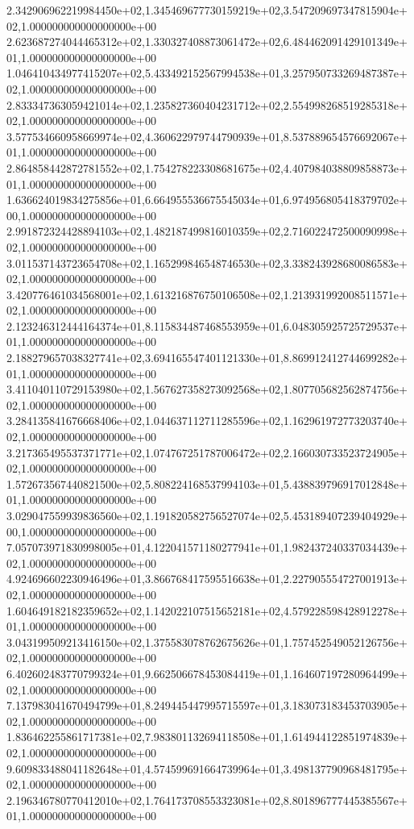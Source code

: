 2.342906962219984450e+02,1.345469677730159219e+02,3.547209697347815904e+02,1.000000000000000000e+00
2.623687274044465312e+02,1.330327408873061472e+02,6.484462091429101349e+01,1.000000000000000000e+00
1.046410434977415207e+02,5.433492152567994538e+01,3.257950733269487387e+02,1.000000000000000000e+00
2.833347363059421014e+02,1.235827360404231712e+02,2.554998268519285318e+02,1.000000000000000000e+00
3.577534660958669974e+02,4.360622979744790939e+01,8.537889654576692067e+01,1.000000000000000000e+00
2.864858442872781552e+02,1.754278223308681675e+02,4.407984038809858873e+01,1.000000000000000000e+00
1.636624019834275856e+01,6.664955536675545034e+01,6.974956805418379702e+00,1.000000000000000000e+00
2.991872324428894103e+02,1.482187499816010359e+02,2.716022472500090998e+02,1.000000000000000000e+00
3.011537143723654708e+02,1.165299846548746530e+02,3.338243928680086583e+02,1.000000000000000000e+00
3.420776461034568001e+02,1.613216876750106508e+02,1.213931992008511571e+02,1.000000000000000000e+00
2.123246312444164374e+01,8.115834487468553959e+01,6.048305925725729537e+01,1.000000000000000000e+00
2.188279657038327741e+02,3.694165547401121330e+01,8.869912412744699282e+01,1.000000000000000000e+00
3.411040110729153980e+02,1.567627358273092568e+02,1.807705682562874756e+02,1.000000000000000000e+00
3.284135841676668406e+02,1.044637112711285596e+02,1.162961972773203740e+02,1.000000000000000000e+00
3.217365495537371771e+02,1.074767251787006472e+02,2.166030733523724905e+02,1.000000000000000000e+00
1.572673567440821500e+02,5.808224168537994103e+01,5.438839796917012848e+01,1.000000000000000000e+00
3.029047559939836560e+02,1.191820582756527074e+02,5.453189407239404929e+00,1.000000000000000000e+00
7.057073971830998005e+01,4.122041571180277941e+01,1.982437240337034439e+02,1.000000000000000000e+00
4.924696602230946496e+01,3.866768417595516638e+01,2.227905554727001913e+02,1.000000000000000000e+00
1.604649182182359652e+02,1.142022107515652181e+02,4.579228598428912278e+01,1.000000000000000000e+00
3.043199509213416150e+02,1.375583078762675626e+01,1.757452549052126756e+02,1.000000000000000000e+00
6.402602483770799324e+01,9.662506678453084419e+01,1.164607197280964499e+02,1.000000000000000000e+00
7.137983041670494799e+01,8.249445447995715597e+01,3.183073183453703905e+02,1.000000000000000000e+00
1.836462255861717381e+02,7.983801132694118508e+01,1.614944122851974839e+02,1.000000000000000000e+00
9.609833488041182648e+01,4.574599691664739964e+01,3.498137790968481795e+02,1.000000000000000000e+00
2.196346780770412010e+02,1.764173708553323081e+02,8.801896777445385567e+01,1.000000000000000000e+00
